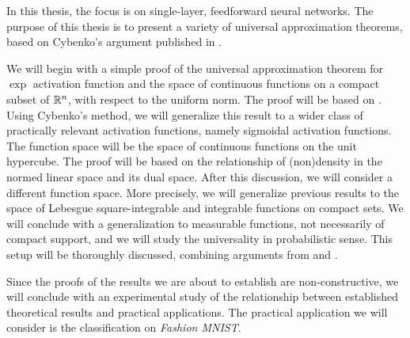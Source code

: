In this thesis, the focus is on single-layer, feedforward neural networks.
The purpose of this thesis is to present a variety of universal approximation theorems, based on Cybenko's argument published in \cite{cybenko_1989_approximation}.

We will begin with a simple proof of the universal approximation theorem for $\exp$ activation function and the space of continuous functions on a compact subset of ${\mathbb R}^n$, with respect to the uniform norm. The proof will be based on . Using Cybenko's method, we will generalize this result to a wider class of practically relevant activation functions, namely sigmoidal activation functions. The function space will be the space of continuous functions on the unit hypercube. The proof will be based on the relationship of (non)density in the normed linear space and its dual space. After this discussion, we will consider a different function space. More precisely, we will generalize previous results to the space of Lebesgue square-integrable and integrable functions on compact sets. We will conclude with a generalization to measurable functions, not necessarily of compact support, and we will study the universality in probabilistic sense. This setup will be thoroughly discussed, combining arguments from \cite{cybenko_1989_approximation} and \cite{hornik}.

Since the proofs of the results we are about to establish are non-constructive, we will conclude with an experimental study of the relationship between established theoretical results and practical applications. The practical application we will consider is the classification on \textit{Fashion MNIST}.